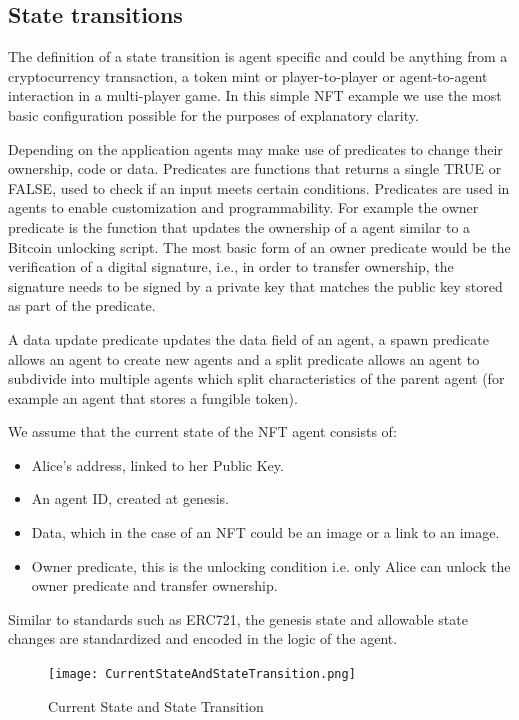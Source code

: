 \documentclass{article}
\begin{document}
\subsection{State transitions}

The definition of a state transition is agent specific and could be anything from a cryptocurrency transaction, a token mint or player-to-player or agent-to-agent interaction in a multi-player game. In this simple NFT example we use the most basic configuration possible for the purposes of explanatory clarity.

Depending on the application agents may make use of predicates to change their ownership, code or data. Predicates are functions that returns a single TRUE or FALSE, used to check if an input meets certain conditions. Predicates are used in agents to enable customization and programmability. For example the owner predicate is the function that updates the ownership of a agent similar to a Bitcoin unlocking script. The most basic form of an owner predicate would be the verification of a digital signature, i.e., in order to transfer ownership, the signature needs to be signed by a private key that matches the public key stored as part of the predicate.

A data update predicate updates the data field of an agent, a spawn predicate allows an agent to create new agents and a split predicate allows an agent to subdivide into multiple agents which split characteristics of the parent agent (for example an agent that stores a fungible token).

We assume that the current state of the NFT agent consists of:

\begin{itemize}
    \item Alice's address, linked to her Public Key.
    \item An agent ID, created at genesis.
    \item Data, which in the case of an NFT could be an image or a link to an image.
    \item Owner  predicate, this is the unlocking condition i.e. only Alice can unlock the owner predicate and transfer ownership.
\end{itemize}

 Similar to standards such as ERC721, the genesis state and allowable state changes are standardized and encoded in the logic of the agent.

\begin{figure}[htbp]
    \centering
    \texttt{[image: CurrentStateAndStateTransition.png]}
    \caption{Current State and State Transition}
    \label{fig:CurrentState}
\end{figure}
\end{document}
